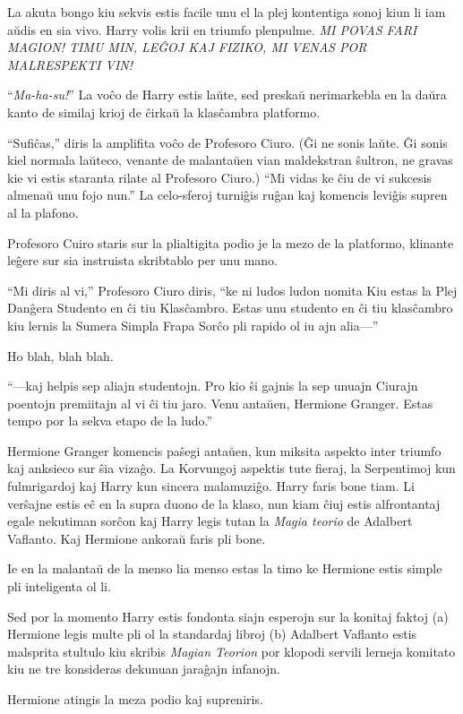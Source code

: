 La akuta bongo kiu sekvis estis facile unu el la plej kontentiga sonoj
kiun li iam aŭdis en sia vivo. Harry volis krii en triumfo
plenpulme. \emph{MI POVAS FARI MAGION! TIMU MIN, LEĜOJ KAJ FIZIKO, MI
VENAS POR MALRESPEKTI VIN!}

``\emph{Ma-ha-su!}'' La voĉo de Harry estis laŭte, sed preskaŭ
nerimarkebla en la daŭra kanto de similaj krioj de ĉirkaŭ la
klasĉambra platformo.

``Sufiĉas,'' diris la amplifita voĉo de Profesoro Ciuro. (Ĝi ne sonis
laŭte. Ĝi sonis kiel normala laŭteco, venante de malantaŭen vian
maldekstran ŝultron, ne gravas kie vi estis staranta rilate al
Profesoro Ciuro.) ``Mi vidas ke ĉiu de vi sukcesis almenaŭ unu fojo
nun.'' La celo-sferoj turniĝis ruĝan kaj komencis leviĝis supren al la
plafono.

Profesoro Cuiro staris sur la plialtigita podio je la mezo de la
platformo, klinante leĝere sur sia instruista skribtablo per unu mano.

``Mi diris al vi,'' Profesoro Ciuro diris, ``ke ni ludos ludon nomita
Kiu estas la Plej Danĝera Studento en ĉi tiu Klasĉambro. Estas unu
studento en ĉi tiu klasĉambro kiu lernis la Sumera Simpla Frapa Sorĉo
pli rapido ol iu ajn alia—''

Ho blah, blah blah.

``—kaj helpis sep aliajn studentojn. Pro kio ŝi gajnis la sep unuajn
Ciurajn poentojn premiitajn al vi ĉi tiu jaro. Venu antaŭen, Hermione
Granger. Estas tempo por la sekva etapo de la ludo.''

Hermione Granger komencis paŝegi antaŭen, kun miksita aspekto inter
triumfo kaj anksieco sur ŝia vizaĝo. La Korvungoj aspektis tute
fieraj, la Serpentimoj kun fulmrigardoj kaj Harry kun sincera
malamuziĝo. Harry faris bone tiam. Li verŝajne estis eĉ en la supra
duono de la klaso, nun kiam ĉiuj estis alfrontantaj egale nekutiman
sorĉon kaj Harry legis tutan la \emph{Magia teorio} de Adalbert
Vaflanto. Kaj Hermione ankoraŭ faris pli bone.

Ie en la malantaŭ de la menso lia menso estas la timo ke Hermione
estis simple pli inteligenta ol li.

Sed por la momento Harry estis fondonta siajn esperojn sur la konitaj
faktoj (a) Hermione legis multe pli ol la standardaj libroj (b)
Adalbert Vaflanto estis malsprita stultulo kiu skribis \emph{Magian
Teorion} por klopodi servili lerneja komitato kiu ne tre konsideras
dekunuan jaraĝajn infanojn.

Hermione atingis la meza podio kaj supreniris.

